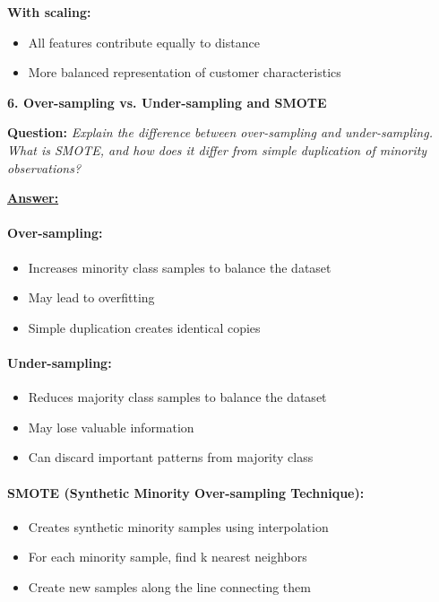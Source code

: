 \documentclass[11pt,a4paper]{article}
\newcommand{\questiontitle}[2]{%
    \vspace{0.4cm}%
    \noindent\textbf{\large\color{headerblue}#1. #2}\par\vspace{0.15cm}%
}
\newcommand{\qprompt}[1]{%
    \noindent\textbf{Question:} \textit{#1}\par\vspace{0.2cm}%
}
\newcommand{\answer}{\noindent\textbf{\underline{Answer:}}\par\vspace{0.15cm}}
\begin{document}
\noindent\textbf{With scaling:}
\begin{itemize}
    \item All features contribute equally to distance
    \item More balanced representation of customer characteristics
\end{itemize}

\vspace{0.35cm}

\questiontitle{6}{Over-sampling vs. Under-sampling and SMOTE}
\qprompt{Explain the difference between over-sampling and under-sampling. What is SMOTE, and how does it differ from simple duplication of minority observations?}
\answer
\paragraph{Over-sampling:}
\begin{itemize}
    \item Increases minority class samples to balance the dataset
    \item May lead to overfitting
    \item Simple duplication creates identical copies
\end{itemize}

\paragraph{Under-sampling:}
\begin{itemize}
    \item Reduces majority class samples to balance the dataset
    \item May lose valuable information
    \item Can discard important patterns from majority class
\end{itemize}

\paragraph{SMOTE (Synthetic Minority Over-sampling Technique):}
\begin{itemize}
    \item Creates synthetic minority samples using interpolation
    \item For each minority sample, find k nearest neighbors
    \item Create new samples along the line connecting them
\end{itemize}
\end{document}
